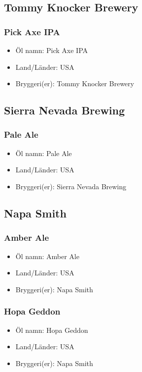 \documentclass[11pt]{article}
\begin{document}
\subsection{Tommy Knocker Brewery}
\label{sec:orgebe2ed5}
\subsubsection{Pick Axe IPA}
\label{sec:org4272c26}
\begin{itemize}
\item Öl namn: Pick Axe IPA
\item Land/Länder: USA
\item Bryggeri(er): Tommy Knocker Brewery
\end{itemize}
\subsection{Sierra Nevada Brewing}
\label{sec:org707c280}
\subsubsection{Pale Ale}
\label{sec:orgb5d7b82}
\begin{itemize}
\item Öl namn: Pale Ale
\item Land/Länder: USA
\item Bryggeri(er): Sierra Nevada Brewing
\end{itemize}
\subsection{Napa Smith}
\label{sec:orgfeab9c4}
\subsubsection{Amber Ale}
\label{sec:org45501b7}
\begin{itemize}
\item Öl namn: Amber Ale
\item Land/Länder: USA
\item Bryggeri(er): Napa Smith
\end{itemize}
\subsubsection{Hopa Geddon}
\label{sec:org194621b}
\begin{itemize}
\item Öl namn: Hopa Geddon
\item Land/Länder: USA
\item Bryggeri(er): Napa Smith
\end{itemize}
\end{document}
